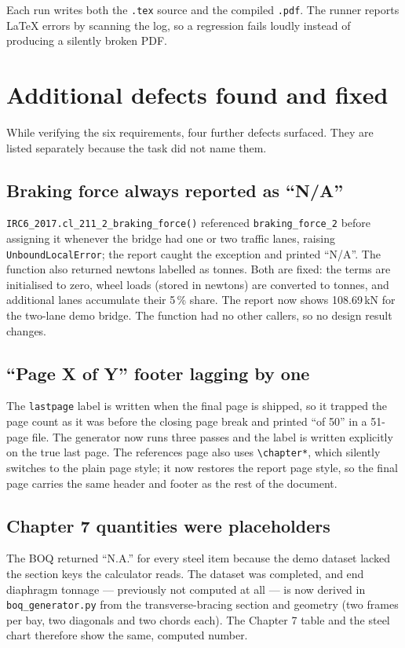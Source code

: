 \documentclass[11pt,a4paper]{article}
\newcommand{\code}[1]{\texttt{\small #1}}
\begin{document}
Each run writes both the \code{.tex} source and the compiled \code{.pdf}. The runner
reports LaTeX errors by scanning the log, so a regression fails loudly instead of
producing a silently broken PDF.

\section{Additional defects found and fixed}

While verifying the six requirements, four further defects surfaced. They are
listed separately because the task did not name them.

\subsection*{Braking force always reported as ``N/A''}

\code{IRC6\_2017.cl\_211\_2\_braking\_force()} referenced
\code{braking\_force\_2} before assigning it whenever the bridge had one or two
traffic lanes, raising \code{UnboundLocalError}; the report caught the exception
and printed ``N/A''. The function also returned newtons labelled as tonnes. Both
are fixed: the terms are initialised to zero, wheel loads (stored in newtons) are
converted to tonnes, and additional lanes accumulate their 5\,\% share. The
report now shows 108.69\,kN for the two-lane demo bridge. The function had no
other callers, so no design result changes.

\subsection*{``Page X of Y'' footer lagging by one}

The \code{lastpage} label is written when the final page is shipped, so it
trapped the page count as it was before the closing page break and printed
``of 50'' in a 51-page file. The generator now runs three passes and the label
is written explicitly on the true last page. The references page also uses
\code{\textbackslash chapter*}, which silently switches to the plain page style;
it now restores the report page style, so the final page carries the same header
and footer as the rest of the document.

\subsection*{Chapter 7 quantities were placeholders}

The BOQ returned ``N.A.'' for every steel item because the demo dataset lacked
the section keys the calculator reads. The dataset was completed, and end
diaphragm tonnage --- previously not computed at all --- is now derived in
\code{boq\_generator.py} from the transverse-bracing section and geometry
(two frames per bay, two diagonals and two chords each). The Chapter 7 table and
the steel chart therefore show the same, computed number.
\end{document}
